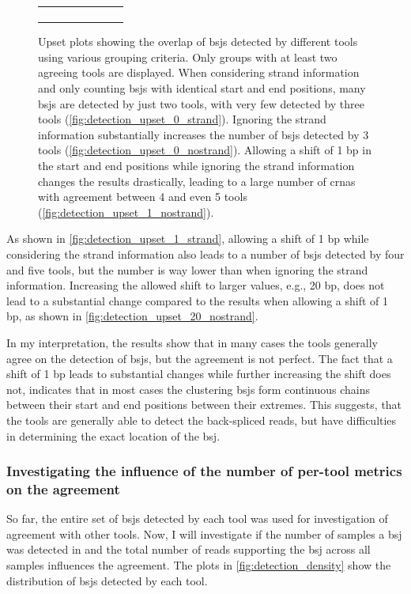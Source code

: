 \begin{figure}[ht]
\begin{tabular}{cc}
{\begin{subfigure}{\textwidth}
                       \end{subfigure}}\end{tabular} \caption{Upset plots
        showing the overlap of
        \gls{bsj}s detected by different tools using various grouping criteria.
        Only groups with at least two agreeing tools are displayed.
        When considering strand information and only counting \gls{bsj}s with identical
        start and end positions, many \gls{bsj}s are detected by just two tools, with
        very few detected by three tools (\cref{fig:detection_upset_0_strand}).
        Ignoring the strand information substantially increases the number of
        \gls{bsj}s detected by 3 tools (\cref{fig:detection_upset_0_nostrand}).
        Allowing a shift of 1 bp in the start and end positions while ignoring the
        strand information changes the results drastically, leading to a large number
        of \gls{crna}s with agreement between 4 and even 5 tools
        (\cref{fig:detection_upset_1_nostrand}).
    }
    \label{fig:detection_upset}
\end{figure}

As shown in \cref{fig:detection_upset_1_strand}, allowing a shift of 1 bp while
considering the strand information also leads to a number of \gls{bsj}s
detected by four and five tools, but the number is way lower than when ignoring
the strand information.
Increasing the allowed shift to larger values, e.g., 20 bp, does not lead to a
substantial change compared to the results when allowing a shift of 1 bp, as
shown in \cref{fig:detection_upset_20_nostrand}.

In my interpretation, the results show that in many cases the tools generally
agree on the detection of \gls{bsj}s, but the agreement is not perfect.
The fact that a shift of 1 bp leads to substantial changes while further
increasing the shift does not, indicates that in most cases the clustering
\gls{bsj}s form continuous chains between their start and end positions between
their extremes.
This suggests, that the tools are generally able to detect the back-spliced
reads, but have difficulties in determining the exact location of the
\gls{bsj}.

\subsubsection{Investigating the influence of the number of per-tool metrics on
    the agreement}

So far, the entire set of \gls{bsj}s detected by each tool was used for
investigation of agreement with other tools.
Now, I will investigate if the number of samples a \gls{bsj} was detected in
and the total number of reads supporting the \gls{bsj} across all samples
influences the agreement.
The plots in \cref{fig:detection_density} show the distribution of \gls{bsj}s
detected by each tool.

